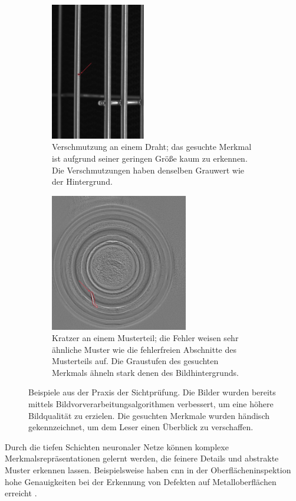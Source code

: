 \begin{figure}[h]

\begin{subfigure}{0.5\textwidth}
\includegraphics[width=0.9\linewidth, height=6cm]{expose/Fehler.jpg} 
\caption{Verschmutzung an einem Draht; das gesuchte Merkmal ist aufgrund seiner geringen Größe kaum zu erkennen. Die Verschmutzungen haben denselben Grauwert wie der Hintergrund.}
\label{fig:subim1}
\end{subfigure}
\begin{subfigure}{0.5\textwidth}
\includegraphics[width=0.9\linewidth, height=6cm]{expose/Kratzer.jpg}
\caption{Kratzer an einem Musterteil; die Fehler weisen sehr ähnliche Muster wie die fehlerfreien Abschnitte des Musterteils auf. Die Graustufen des gesuchten Merkmals ähneln stark denen des Bildhintergrunds.}
\label{fig:subim2}
\end{subfigure}

\caption{Beispiele aus der Praxis der Sichtprüfung. Die Bilder wurden bereits mittels Bildvorverarbeitungsalgorithmen verbessert, um eine höhere Bildqualität zu erzielen. Die gesuchten Merkmale wurden händisch gekennzeichnet, um dem Leser einen Überblick zu verschaffen.}

\label{fig:image2}
\end{figure}

Durch die tiefen Schichten neuronaler Netze können komplexe Merkmalsrepräsentationen gelernt werden, die feinere Details und abstrakte Muster erkennen lassen. Beispielsweise haben \gls{cnn} in der Oberflächeninspektion hohe Genauigkeiten bei der Erkennung von Defekten auf Metalloberflächen erreicht \citep{saberironaghi_defect_2023}.

